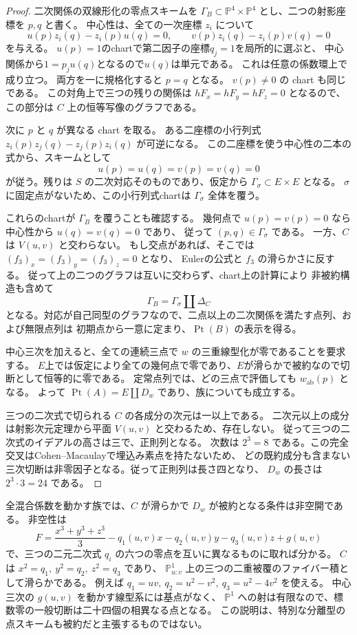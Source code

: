 \begin{proof}
二次関係の双線形化の零点スキームを
$\Gamma_B\subset\mathbb P^4\times\mathbb P^4$ とし、二つの射影座標を $p,q$ と書く。
中心性は、全ての一次座標 $z_i$ について
\[
 u(p)z_i(q)-z_i(p)u(q)=0,\qquad
 v(p)z_i(q)-z_i(p)v(q)=0
\]
を与える。
$u(p)=1$のchartで第二因子の座標$q_j=1$を局所的に選ぶと、
中心関係から$1=p_j u(q)$となるので$u(q)$は単元である。
これは任意の係数環上で成り立つ。
両方を一に規格化すると $p=q$ となる。
$v(p)\ne0$ の chart も同じである。
この対角上で三つの残りの関係は $hF_x=hF_y=hF_z=0$ となるので、
この部分は $C$ 上の恒等写像のグラフである。

次に $p$ と $q$ が異なる chart を取る。
ある二座標の小行列式
$z_i(p)z_j(q)-z_j(p)z_i(q)$ が可逆になる。
この二座標を使う中心性の二本の式から、スキームとして
\[
 u(p)=u(q)=v(p)=v(q)=0
\]
が従う。残りは $S$ の二次対応そのものであり、仮定から
$\Gamma_\sigma\subset E\times E$ となる。
$\sigma$ に固定点がないため、この小行列式chartは $\Gamma_\sigma$ 全体を覆う。

これらのchartが $\Gamma_B$ を覆うことも確認する。
幾何点で $u(p)=v(p)=0$ なら中心性から $u(q)=v(q)=0$ であり、
従って $(p,q)\in\Gamma_\sigma$ である。
一方、$C$ は $V(u,v)$ と交わらない。
もし交点があれば、そこでは $(f_3)_x=(f_3)_y=(f_3)_z=0$ となり、
Eulerの公式と $f_3$ の滑らかさに反する。
従って上の二つのグラフは互いに交わらず、chart上の計算により
非被約構造も含めて
\[
 \Gamma_B=\Gamma_\sigma\amalg\Delta_C
\]
となる。対応が自己同型のグラフなので、二点以上の二次関係を満たす点列、および無限点列は
初期点から一意に定まり、$\operatorname{Pt}(B)$ の表示を得る。

中心三次を加えると、全ての連続三点で $w$ の三重線型化が零であることを要求する。
$E$上では仮定により全ての幾何点で零であり、$E$が滑らかで被約なので切断として恒等的に零である。
定常点列では、どの三点で評価しても $w_{\mathrm{ab}}(p)$ となる。
よって $\operatorname{Pt}(A)=E\amalg D_w$ であり、族についても成立する。

三つの二次式で切られる $C$ の各成分の次元は一以上である。
二次元以上の成分は射影次元定理から平面 $V(u,v)$ と交わるため、存在しない。
従って三つの二次式のイデアルの高さは三で、正則列となる。
次数は $2^3=8$ である。この完全交叉はCohen--Macaulayで埋込み素点を持たないため、
どの既約成分も含まない三次切断は非零因子となる。従って正則列は長さ四となり、
$D_w$ の長さは $2^3\cdot3=24$ である。
\end{proof}

\begin{remark}[一般点での二十四個の相異なる点]
全混合係数を動かす族では、$C$ が滑らかで $D_w$ が被約となる条件は非空開である。
非空性は
\[
 F=\frac{x^3+y^3+z^3}{3}
   -q_1(u,v)x-q_2(u,v)y-q_3(u,v)z+g(u,v)
\]
で、三つの二元二次式 $q_i$ の六つの零点を互いに異なるものに取れば分かる。
$C$ は $x^2=q_1,\ y^2=q_2,\ z^2=q_3$ であり、
$\mathbb P^1_{u:v}$ 上の三つの二重被覆のファイバー積として滑らかである。
例えば $q_1=uv,\ q_2=u^2-v^2,\ q_3=u^2-4v^2$ を使える。
中心三次の $g(u,v)$ を動かす線型系には基点がなく、
$\mathbb P^1$ への射は有限なので、標数零の一般切断は二十四個の相異なる点となる。
この説明は、特別な分離型の点スキームも被約だと主張するものではない。
\end{remark}


